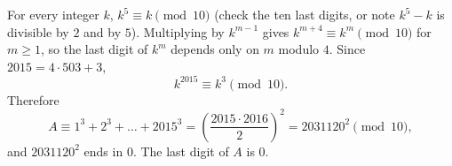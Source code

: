 For every integer $k$, $k^5\equiv k\pmod{10}$ (check the ten last digits, or note $k^5-k$ is divisible by $2$ and by $5$). Multiplying by $k^{m-1}$ gives $k^{m+4}\equiv k^m\pmod{10}$ for $m\ge1$, so the last digit of $k^m$ depends only on $m$ modulo $4$. Since $2015=4\cdot503+3$,
\[
k^{2015}\equiv k^3\pmod{10}.
\]
Therefore
\[
A\equiv1^3+2^3+\dots+2015^3=\left(\dfrac{2015\cdot2016}{2}\right)^2=2031120^2\pmod{10},
\]
and $2031120^2$ ends in $0$. The last digit of $A$ is $\boxed{0}$.
